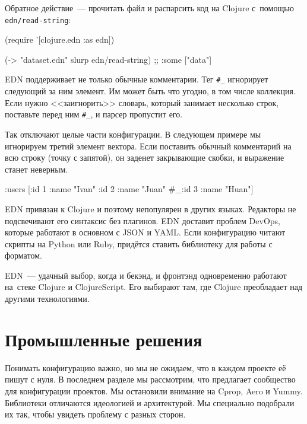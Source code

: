 Обратное действие~--- прочитать файл и распарсить код на Clojure с~помощью
\verb|edn/read-string|:

\begin{english}
  \begin{clojure}
(require '[clojure.edn :as edn])

(-> "dataset.edn" slurp edn/read-string)
;; {:some ["data"]}
  \end{clojure}
\end{english}


EDN поддерживает не только обычные комментарии. Тег \verb|#_| игнорирует
следующий за ним элемент. Им может быть что угодно, в том числе коллекция. Если
нужно <<заигнорить>> словарь, который занимает несколько строк, поставьте перед
ним \verb|#_|, и парсер пропустит его.


Так отключают целые части конфигурации. В следующем примере мы игнорируем третий
элемент вектора. Если поставить обычный комментарий на всю строку (точку с
запятой), он заденет закрывающие скобки, и выражение станет неверным.

\begin{english}
  \begin{clojure}
{:users [{:id 1 :name "Ivan"}
         {:id 2 :name "Juan"}
         #_{:id 3 :name "Huan"}]}
  \end{clojure}
\end{english}

EDN привязан к Clojure и поэтому непопулярен в других языках. Редакторы не
подсвечивают его синтаксис без плагинов. EDN доставит проблем DevOps, которые
работают в основном с JSON и YAML. Если конфигурацию читают скрипты на Python
или Ruby, придётся ставить библиотеку для работы с форматом.

EDN~--- удачный выбор, когда и бекэнд, и фронтэнд одновременно работают на~стеке
Clojure и ClojureScript. Его выбирают там, где Clojure преобладает над другими
технологиями.

\section{Промышленные решения}

Понимать конфигурацию важно, но мы не ожидаем, что в каждом проекте её пишут с
нуля. В последнем разделе мы рассмотрим, что предлагает сообщество для
конфигурации проектов. Мы остановили внимание на Cprop, Aero и Yummy. Библиотеки
отличаются идеологией и архитектурой. Мы специально подобрали их так, чтобы
увидеть проблему с разных сторон.

